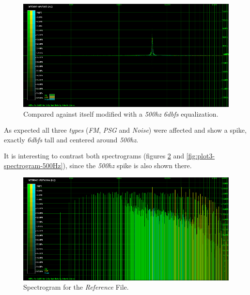 \documentclass[10pt,a4paper]{report}
\newcommand{\hz}[1]{\textit{\mbox{#1\acrshort{hz}}}}
\newcommand{\db}[1]{\textit{\mbox{#1\acrshort{dbfs}}}}
\begin{document}
\begin{figure}[H]
	\centering
	\includegraphics[width=1.0\linewidth]{images/interpretation/Plot3-Modified.png}
	\caption[1kHz modified]{Compared against itself modified with a \hz{500} \db{6} equalization.}
	\label{fig:plot3-modified}
\end{figure}

As expected all three \textit{types} (\textit{FM}, \textit{PSG} and \textit{Noise}) were affected and show a spike, exactly \db{6} tall and centered around \hz{500}.

It is interesting to contrast both spectrograms (figures \ref{fig:plot3-spectrogram} and \ref{fig:plot3-spectrogram-500Hz}), since the \hz{500} spike is also shown there.

\begin{figure}[H]
	\centering
	\includegraphics[width=1.0\linewidth]{images/interpretation/Plot3-Spectrogram.png}
	\caption[Reference File]{Spectrogram for the \textit{Reference} File.}
	\label{fig:plot3-spectrogram}
\end{figure}
\end{document}
